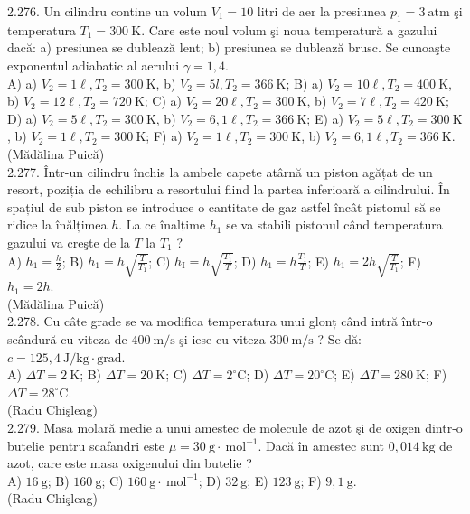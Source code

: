 \documentclass[10pt]{article}
\begin{document}
2.276. Un cilindru contine un volum $V_{1}=10$ litri de aer la presiunea $p_{1}=3 \mathrm{~atm}$ şi temperatura $T_{1}=300 \mathrm{~K}$. Care este noul volum şi noua temperatură a gazului dacă: a) presiunea se dublează lent; b) presiunea se dublează brusc. Se cunoaşte exponentul adiabatic al aerului $\gamma=1,4$.\\ A) a) $V_{2}=1 \ell , T_{2}=300 \mathrm{~K}$, b) $V_{2}=5 l , T_{2}=366 \mathrm{~K}$; B) a) $V_{2}=10 \ell , T_{2}=400 \mathrm{~K}$, b) $V_{2}=12 \ell , T_{2}=720 \mathrm{~K}$; C) a) $V_{2}=20 \ell , T_{2}=300 \mathrm{~K}$, b) $V_{2}=7 \ell , T_{2}=420 \mathrm{~K}$; D) a) $V_{2}=5 \ell , T_{2}=300 \mathrm{~K}$, b) $V_{2}=6,1 \ell , T_{2}=366 \mathrm{~K}$; E) a) $V_{2}=5 \ell , T_{2}=300 \mathrm{~K}$, b) $V_{2}=1 \ell , T_{2}=300 \mathrm{~K}$; F) a) $V_{2}=1 \ell , T_{2}=300 \mathrm{~K}$, b) $V_{2}=6,1 \ell , T_{2}=366 \mathrm{~K}$.\\ (Mădălina Puică)\\

2.277. Într-un cilindru închis la ambele capete atârnă un piston agățat de un resort, poziția de echilibru a resortului fiind la partea inferioară a cilindrului. În spațiul de sub piston se introduce o cantitate de gaz astfel încât pistonul să se ridice la înălțimea $h$. La ce înalțime $h_{1}$ se va stabili pistonul când temperatura gazului va creşte de la $T$ la $T_{1}$ ?\\ A) $h_{1}=\frac{h}{2}$; B) $h_{1}=h \sqrt{\frac{T}{T_{1}}}$; C) $h_{\mathrm{I}}=h \sqrt{\frac{T_{1}}{T}}$; D) $h_{1}=h \frac{T_{1}}{T}$; E) $h_{1}=2 h \sqrt{\frac{T}{T_{1}}}$; F) $h_{1}=2 h$.\\ (Mădălina Puică)\\

2.278. Cu câte grade se va modifica temperatura unui glonț când intră într-o scândură cu viteza de $400 \mathrm{~m} / \mathrm{s}$ şi iese cu viteza $300 \mathrm{~m} / \mathrm{s}$ ? Se dă: $c=125,4 \mathrm{~J} / \mathrm{kg} \cdot \mathrm{grad}$.\\ A) $\Delta T=2 \mathrm{~K}$; B) $\Delta T=20 \mathrm{~K}$; C) $\Delta T=2^{\circ} \mathrm{C}$; D) $\Delta T=20^{\circ} \mathrm{C}$; E) $\Delta T=280 \mathrm{~K}$; F) $\Delta T=28^{\circ} \mathrm{C}$.\\ (Radu Chişleag)\\

2.279. Masa molară medie a unui amestec de molecule de azot şi de oxigen dintr-o butelie pentru scafandri este $\mu=30 \mathrm{~g} \cdot \mathrm{~mol}^{-1}$. Dacă în amestec sunt $0,014 \mathrm{~kg}$ de azot, care este masa oxigenului din butelie ?\\ A) $16 \mathrm{~g}$; B) $160 \mathrm{~g}$; C) $160 \mathrm{~g} \cdot \mathrm{~mol}^{-1}$; D) $32 \mathrm{~g}$; E) $123 \mathrm{~g}$; F) $9,1 \mathrm{~g}$.\\ (Radu Chişleag)\\
\end{document}
